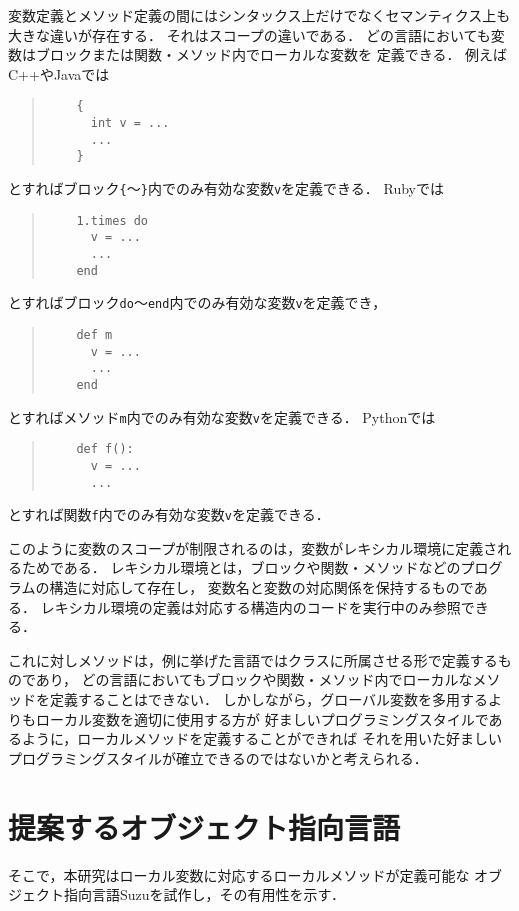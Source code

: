 \documentclass[a4paper,11pt,dvipdfmx]{jreport}
\begin{document}
変数定義とメソッド定義の間にはシンタックス上だけでなくセマンティクス上も
大きな違いが存在する．
それはスコープの違いである．
どの言語においても変数はブロックまたは関数・メソッド内でローカルな変数を
定義できる．
例えばC++やJavaでは
\begin{quote}
	\begin{verbatim}
	{
	  int v = ...
	  ...
	}
	\end{verbatim}
\end{quote}
とすればブロック\verb|{|～\verb|}|内でのみ有効な変数\verb|v|を定義できる．
Rubyでは
\begin{quote}
	\begin{verbatim}
	1.times do
	  v = ...
	  ...
	end
	\end{verbatim}
\end{quote}
とすればブロック\verb|do|～\verb|end|内でのみ有効な変数\verb|v|を定義でき，
\begin{quote}
	\begin{verbatim}
	def m
	  v = ...
	  ...
	end
	\end{verbatim}
\end{quote}
とすればメソッド\verb|m|内でのみ有効な変数\verb|v|を定義できる．
Pythonでは
\begin{quote}
	\begin{verbatim}
	def f():
	  v = ...
	  ...
	\end{verbatim}
\end{quote}
とすれば関数\verb|f|内でのみ有効な変数\verb|v|を定義できる．

このように変数のスコープが制限されるのは，変数がレキシカル環境に定義されるためである．
レキシカル環境とは，ブロックや関数・メソッドなどのプログラムの構造に対応して存在し，
変数名と変数の対応関係を保持するものである．
レキシカル環境の定義は対応する構造内のコードを実行中のみ参照できる．

これに対しメソッドは，例に挙げた言語ではクラスに所属させる形で定義するものであり，
どの言語においてもブロックや関数・メソッド内でローカルなメソッドを定義することはできない．
しかしながら，グローバル変数を多用するよりもローカル変数を適切に使用する方が
好ましいプログラミングスタイルであるように，ローカルメソッドを定義することができれば
それを用いた好ましいプログラミングスタイルが確立できるのではないかと考えられる．

\section{提案するオブジェクト指向言語}

そこで，本研究はローカル変数に対応するローカルメソッドが定義可能な
オブジェクト指向言語Suzuを試作し，その有用性を示す．
\end{document}
